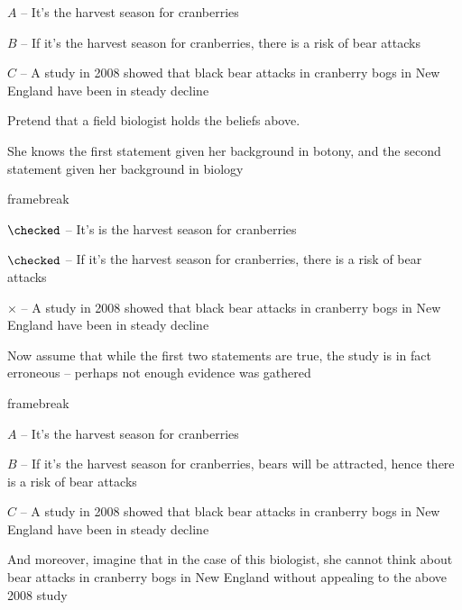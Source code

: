   \begin{itemizeminus}
    \item[$A$ -- ] It's the harvest season for cranberries
    
    \item[$B$  -- ] If it's the harvest season for cranberries, there is a risk of
    bear attacks
    
    \item[$C$ -- ] A study in 2008 showed that black bear attacks in cranberry bogs
    in New England have been in steady decline
  \end{itemizeminus}
Pretend that a field biologist holds the beliefs above.

  She knows the first statement given her background in
  botony, and the second statement given her background in biology

framebreak

  \begin{itemizeminus}
    \item[$\checked$ -- ] It's is the harvest season for cranberries
    
    \item[$\checked$ -- ] If it's the harvest season for cranberries, there is a
    risk of bear attacks
    
    \item[$\times$ -- ] A study in 2008 showed that black bear attacks in cranberry
    bogs in New England have been in steady decline
  \end{itemizeminus}
  Now assume that while the first two statements are true, the study
  is in fact erroneous -- perhaps not enough evidence was
  gathered

framebreak

  \begin{itemizeminus}
    \item[$A$ -- ] It's the harvest season for cranberries
    
    \item[$B$ -- ] If it's the harvest season for cranberries, bears will be
    attracted, hence there is a risk of bear attacks
    
    \item[$C$ -- ] A study in 2008 showed that black bear attacks in cranberry bogs
    in New England have been in steady decline
  \end{itemizeminus}
  And moreover, imagine that in the case of this biologist, she cannot think about bear attacks in
  cranberry bogs in New England without appealing to the above 2008 study
  
